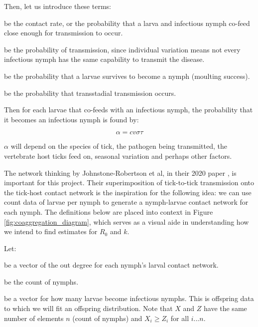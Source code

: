 \documentclass{article}
\begin{document}
Then, let us introduce these terms:

\begin{description}[leftmargin=1cm, style=nextline]
    \item[$ c $] be the contact rate, or the probability that a larva and infectious nymph co-feed close enough for transmission to occur.
    \item[$ v $] be the probability of transmission, since individual variation means not every infectious nymph has the same capability to transmit the disease.
    \item[$ \sigma $] be the probability that a larvae survives to become a nymph (moulting success).
    \item[$ \tau $] be the probability that transstadial transmission occurs.
\end{description}

Then for each larvae that co-feeds with an infectious nymph, the probability that it becomes an infectious nymph is found by:

\begin{equation} \label{alphaDef}
    \alpha = c v \sigma \tau
\end{equation}

$ \alpha $ will depend on the species of tick, the pathogen being transmitted, the vertebrate host ticks feed on, seasonal variation and perhaps other factors.

The network thinking by Johnstone-Robertson et al, in their 2020 paper \cite{JohnstoneRobertson2020}, is important for this project. Their superimposition of tick-to-tick transmission onto the tick-host contact network is the inspiration for the following idea: we can use count data of larvae per nymph to generate a nymph-larvae contact network for each nymph. The definitions below are placed into context in Figure \ref{fig:coaggregation_diagram}, which serves as a visual aide in understanding how we intend to find estimates for $ R_0 $ and $ k $.

Let:

\begin{description}[leftmargin=1cm, style=nextline]
    \item[$ X $] be a vector of the out degree for each nymph's larval contact network.
	\item[$ n $] be the count of nymphs.
    \item[$ Z $] be a vector for how many larvae become infectious nymphs. This is offspring data to which we will fit an offspring distribution. Note that $ X $ and $ Z $ have the same number of elements $ n $ (count of nymphs) and $ X_i \ge Z_i $ for all $ i...n $. 
\end{description}
\end{document}
